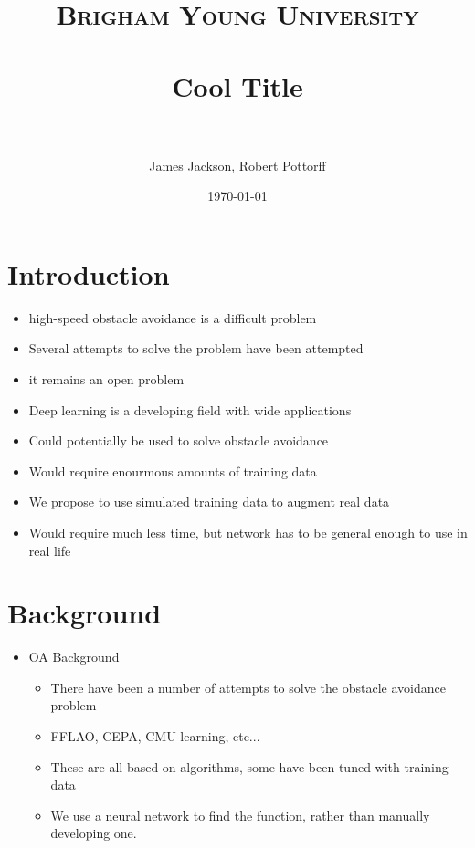 \documentclass[paper=a4, fontsize=11pt]{scrartcl} %
\title{
\normalfont \normalsize
\textsc{Brigham Young University} \\ [25pt] %
\horrule{0.5pt} \\[0.4cm] %
\huge Cool Title \\ %
\horrule{2pt} \\[0.5cm] %
}
\author{James Jackson, Robert Pottorff} %
\date{\normalsize\today} %
\begin{document}
\maketitle %





\section{Introduction}

\begin{itemize}
	\item high-speed obstacle avoidance is a difficult problem
	\item Several attempts to solve the problem have been attempted
	\item it remains an open problem
	\item Deep learning is a developing field with wide applications
	\item Could potentially be used to solve obstacle avoidance
	\item Would require enourmous amounts of training data
	\item We propose to use simulated training data to augment real data
	\item Would require much less time, but network has to be general enough to use in real life
\end{itemize}

\section{Background}

\begin{itemize}
	\item OA Background
	\begin{itemize}
		\item There have been a number of attempts to solve the obstacle avoidance problem
		\item FFLAO, CEPA, CMU learning, etc...
		\item These are all based on algorithms, some have been tuned with training data
		\item We use a neural network to find the function, rather than manually developing one.
	\end{itemize}
\end{itemize}
\end{document}
